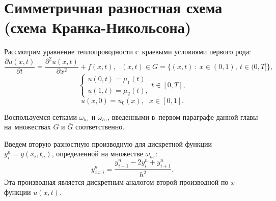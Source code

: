 \documentclass[11pt,a4paper,twoside,listtotoc,bibtotoc]{report}
\numberwithin{equation}{section}
\theoremstyle{definition}
\theoremstyle{plain}
\begin{document}
\section{Симметричная разностная схема (схема Кранка-Никольсона)}
%
Рассмотрим уравнение теплопроводности с~краевыми условиями первого рода:
%
\begin{equation}
%
    \label{temp_equ_4}
    \frac{\partial u(x,t)}{\partial t} =
    \frac{\partial^2u(x,t)}{\partial x^2} + f(x,t),
    ~~~(x,t) \in G = \{(x, t)~:~x \in (0,1),~t\in (0,T]\},
%
\end{equation}
%
%
\begin{equation}
%
    \label{bord_4}
    \begin{cases}
        u(0,t) = \mu_1(t) \\
        u(1,t) = \mu_2(t),
    \end{cases}
    t\in [0,T],
%
\end{equation}
%
%
\begin{equation}
%
    \label{start_val_4}
    u(x,0) = u_0(x),~~~x\in[0,1].
%
\end{equation}

Воспользуемся сетками $\omega_{h \tau}$ и $\overline{\omega}_{h \tau}$,
введенными в~первом параграфе данной главы на~множествах $G$ и
$\overline{G}$ соответственно.

%
Введем вторую разностную производную для дискретной функции $y_i^n = y(x_i, t_n)$,
определенной на множестве $\overline{\omega}_{h \tau}$:
%
$$
    y_{\overline{x}x, i}^n = \frac{y_{i-1}^n - 2y_i^n + y_{i+1}^n}{h^2}.
$$
%
Эта производная является дискретным аналогом второй производной по $x$
функции $u(x,t)$.
\end{document}
